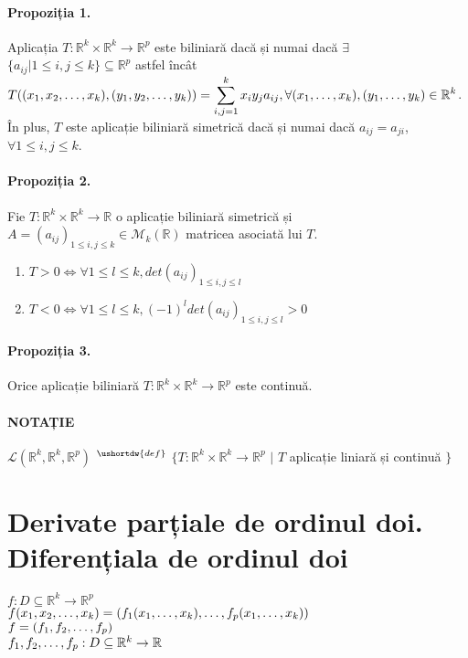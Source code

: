 \paragraph{Propoziția 1.}
Aplicația $T:\mathbb{R}^{k} \times \mathbb{R}^{k} \rightarrow \mathbb{R}^{p}$ este biliniară dacă și numai dacă
$\exists$ $\{ a_{ij} \vert 1 \leq i, j \leq k \} \subseteq \mathbb{R}^{p}$ astfel încât
$T((x_{1}, x_{2}, \mathellipsis, x_{k}), (y_{1}, y_{2}, \mathellipsis, y_{k})) = \displaystyle\sum_{i,j=1}^{k} x_{i}y_{j}a_{ij},
\forall (x_{1}, \mathellipsis, x_{k}), (y_{1}, \mathellipsis, y_{k}) \in \mathbb{R}^{k}$. \\
În plus, $T$ este aplicație biliniară simetrică dacă și numai dacă $a_{ij} = a_{ji}$, $\forall 1 \leq i, j \leq k$.

\paragraph{Propoziția 2.}
Fie $T:\mathbb{R}^{k} \times \mathbb{R}^{k} \rightarrow \mathbb{R}$ o aplicație biliniară simetrică și $A=(a_{ij})_{1 \leq i, j \leq k} \in \mathcal{M}_{k}(\mathbb{R})$
matricea asociată lui $T$.

\begin{enumerate}[label=\emph{\alph*})]
    \item $T>0 \Leftrightarrow \forall 1 \leq l \leq k, det(a_{ij})_{1 \leq i, j \leq l}$
    \item $T<0 \Leftrightarrow \forall 1 \leq l \leq k, (-1)^{l} det(a_{ij})_{1 \leq i, j \leq l} > 0$
\end{enumerate}

\paragraph{Propoziția 3.}
Orice aplicație biliniară $T:\mathbb{R}^{k} \times \mathbb{R}^{k} \rightarrow \mathbb{R}^{p}$ este continuă.

\paragraph{NOTAȚIE}
$\mathcal{L}(\mathbb{R}^{k}, \mathbb{R}^{k}, \mathbb{R}^{p})$ $^{\ushortdw{def}}$
$\{ T:\mathbb{R}^{k} \times \mathbb{R}^{k} \rightarrow \mathbb{R}^{p}$ $\vert$ $T$ aplicație liniară și continuă $\}$

\section{Derivate parțiale de ordinul doi. \\ Diferențiala de ordinul doi}
$f:D \subseteq \mathbb{R}^{k} \rightarrow \mathbb{R}^{p}$ \\
$f(x_{1}, x_{2}, \mathellipsis, x_{k}) = (f_{1}(x_{1}, \mathellipsis, x_{k}), \mathellipsis, f_{p}(x_{1}, \mathellipsis, x_{k}))$ \\
$f = (f_{1}, f_{2}, \mathellipsis, f_{p})$ \\
$f_{1}, f_{2}, \mathellipsis, f_{p}:D \subseteq \mathbb{R}^{k} \rightarrow \mathbb{R}$

